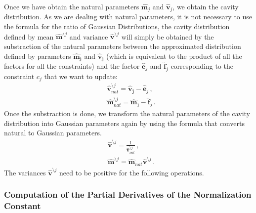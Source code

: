 \documentclass[review,preprint,12pt]{elsarticle}
\begin{document}
Once we have obtain the natural parameters $\boldsymbol{\hat{m}}_{j}$ and $\boldsymbol{\hat{v}}_{j}$, we obtain the cavity distribution. As we are dealing with natural parameters, it is not necessary to use the formula for the ratio of Gaussian Distributions, the cavity distribution defined by mean $\boldsymbol{\hat{m}}^{\setminus j}$ and variance $\boldsymbol{\hat{v}}^{\setminus j}$ will simply be obtained by the substraction of the natural parameters between the approximated distribution defined by parameters $\boldsymbol{\hat{m}_{j}}$ and $\boldsymbol{\hat{v}_{j}}$ (which is equivalent to the product of all the factors for all the constraints) and the factor $\boldsymbol{\hat{e}}_{j}$ and $\boldsymbol{\hat{f}}_{j}$ corresponding to the constraint $c_j$ that we want to update:
\begin{align}
& \boldsymbol{\hat{v}}_{nat}^{\setminus j} = \boldsymbol{\hat{v}_{j}} - \boldsymbol{\hat{e}}_{j}\,, \nonumber \\
& \boldsymbol{\hat{m}}_{nat}^{\setminus j} = \boldsymbol{\hat{m}_{j}} - \boldsymbol{\hat{f}}_{j}\,.
\end{align}
Once the substraction is done, we transform the natural parameters of the cavity distribution into Gaussian parameters again by using the formula that converts natural to Gaussian parameters.
\begin{align}
& \boldsymbol{\hat{v}}^{\setminus j} = \frac{1}{\boldsymbol{\hat{v}}_{nat}^{\setminus j}}\,, \nonumber \\
& \boldsymbol{\hat{m}}^{\setminus j} = \boldsymbol{\hat{m}}_{nat} \boldsymbol{\hat{v}}^{\setminus j}\,.
\end{align}
The variances $\boldsymbol{\hat{v}}^{\setminus j}$ need to be positive for the following operations.

\subsubsection{Computation of the Partial Derivatives of the Normalization Constant}
\end{document}
